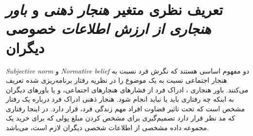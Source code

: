 \section*{تعریف نظری متغیر
    \textit{هنجار ذهنی }
    و
    \textit{باور هنجاری از ارزش اطلاعات}
    خصوصی دیگران}
    \textit{
        \gls{Subjective norm}
    }
    و
    \textit{
        \gls{Normative belief}
    }
    دو مفهوم اساسی هستند که نگرش فرد نسبت به هنجار اجتماعی نسبت به یک موضوع را در 
    نظریه رفتار برنامه‌ریزی شده
    تعریف می‌کنند. 
    باور هنجاری
    ، ادراک فرد از فشار‌های هنجارهای اجتماعی،  و یا باورهای دیگران 
    به اینکه چه رفتاری باید یا نباید انجام شود. 
    هنجار ذهنی
    ادراک فرد درباره یک رفتار مشخص است که تحت تاثیر قضاوت افراد مهم زندگی 
فرد، قرار دارد. 
در اینجا رفتاری که مد نظر قرار دارد تصمیم‌گیری برای مشخص کردن مبلغ پولی که برای خرید  یک مجموعه داده مشخصی از اطلاعات 
شخصی دیگران لازم است، می‌باشد.
    \!\citep{amjadIdentifyingChangingNormative2009}

